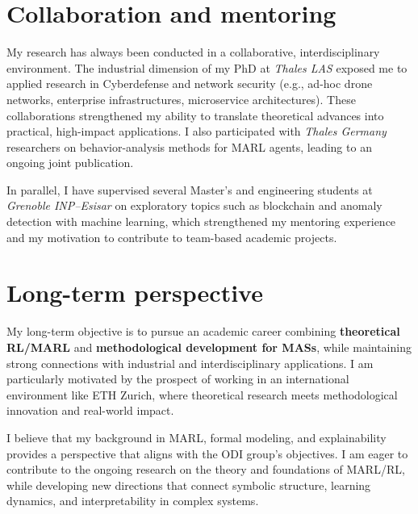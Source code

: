 \documentclass[11pt,a4paper,sans]{moderncv}
\begin{document}
\section*{Collaboration and mentoring}

My research has always been conducted in a collaborative, interdisciplinary environment.
The industrial dimension of my PhD at \textit{Thales LAS} exposed me to applied research in Cyberdefense and network security (e.g., ad-hoc drone networks, enterprise infrastructures, microservice architectures).
These collaborations strengthened my ability to translate theoretical advances into practical, high-impact applications.
I also participated with \textit{Thales Germany} researchers on behavior-analysis methods for MARL agents, leading to an ongoing joint publication.

In parallel, I have supervised several Master's and engineering students at \emph{Grenoble INP--Esisar} on exploratory topics such as blockchain and anomaly detection with machine learning, which strengthened my mentoring experience and my motivation to contribute to team-based academic projects.

\section*{Long-term perspective}

My long-term objective is to pursue an academic career combining \textbf{theoretical RL/MARL} and \textbf{methodological development for MASs}, while maintaining strong connections with industrial and interdisciplinary applications.
I am particularly motivated by the prospect of working in an international environment like ETH Zurich, where theoretical research meets methodological innovation and real-world impact.

\vspace{0.5em}
\noindent
I believe that my background in MARL, formal modeling, and explainability provides a perspective that aligns with the ODI group's objectives.
I am eager to contribute to the ongoing research on the theory and foundations of MARL/RL, while developing new directions that connect symbolic structure, learning dynamics, and interpretability in complex systems.


\makeletterclosing
\end{document}
